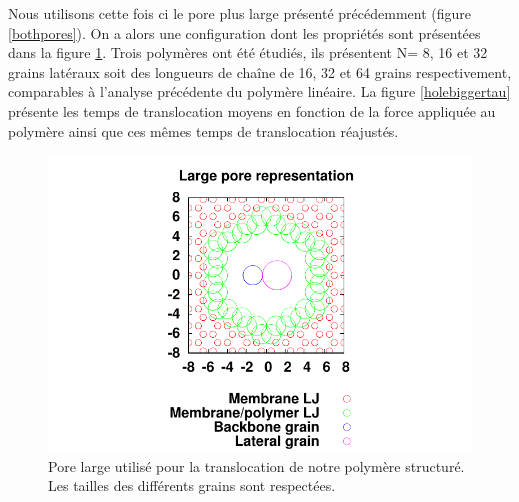Nous utilisons cette fois ci le pore plus large présenté précédemment (figure \ref{bothpores}). On a alors une configuration dont les propriétés sont présentées dans la figure \ref{porelarge}. Trois polymères ont été étudiés, ils présentent N= 8, 16 et 32 grains latéraux soit des longueurs de cha\^ine de 16, 32 et 64 grains respectivement, comparables à l'analyse précédente du polymère linéaire. La figure \ref{holebiggertau} présente les temps de translocation moyens en fonction de la force appliquée au polymère ainsi que ces mêmes temps de translocation réajustés.

\begin{figure}[H]
\begin{center}
\includegraphics[width=1\textwidth]{largepore.pdf}


\caption[Polymère structuré et pore large]{Pore large utilisé pour la translocation de notre polymère structuré. Les tailles des différents grains sont respectées. }
\label{porelarge}
\end{center}
\end{figure}



